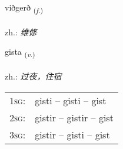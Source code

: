 \documentclass[frontgrid, backgrid]{flacards}\usepackage[]{graphicx}\usepackage[]{xcolor}
\begin{document}
\renewcommand{\flhead}{\vskip5pt \fboxsep=0pt {\small\bfseries\footnotesize Nafnorð | 名词}}
\renewcommand{\fcfoot}{\vskip5pt \fboxsep=0pt \hspace{2pt}{\small\bfseries\footnotesize 3K}}

\renewcommand{\blhead}{\vskip5pt {\small\bfseries\footnotesize Nafnorð | 名词 }}
\renewcommand{\bcfoot}{\vskip5pt \hspace{2pt}{\small\bfseries\footnotesize 3K}}


{viðgerð \small{\textsubscript{(\textit{f.})}} \\[1ex] %
\textphonetic{[vɪðcɛrð]} \\
zh.: \emph{维修} \\  [2ex]
\renewcommand*{\arraystretch}{0.8}
}

\renewcommand{\flhead}{\vskip5pt \fboxsep=0pt {\small\bfseries\footnotesize Sagnorð | 动词}}
\renewcommand{\fcfoot}{\vskip5pt \fboxsep=0pt \hspace{2pt}{\small\bfseries\footnotesize 3K}}

\renewcommand{\blhead}{\vskip5pt {\small\bfseries\footnotesize Sagnorð | 动词 }}
\renewcommand{\bcfoot}{\vskip5pt \hspace{2pt}{\small\bfseries\footnotesize 3K}}


{gista \small{\textsubscript{(\textit{v.})}} \\[1ex] %
\textphonetic{[cɪsta]} \\
zh.: \emph{过夜，住宿} \\  [2ex]
\renewcommand*{\arraystretch}{0.8}
\begin{tabular}{p{1cm}l}
\textsc{1sg}: & gisti -- gisti -- gist \\ 
\textsc{2sg}: & gistir -- gistir -- gist \\ 
\textsc{3sg}: & gistir -- gisti -- gist \\ 
\end{tabular}
}
\end{document}

